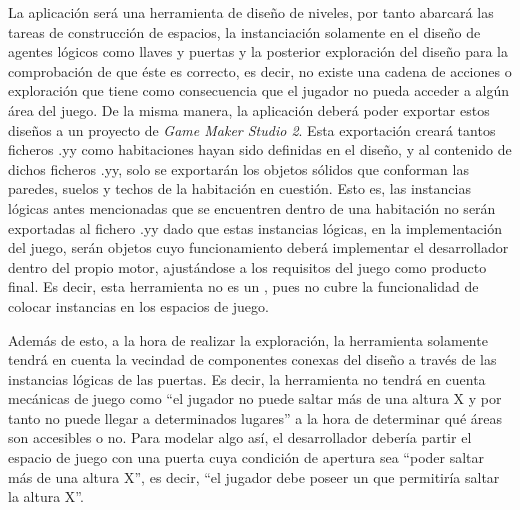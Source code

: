 La aplicación será una herramienta de diseño de niveles, por tanto abarcará las tareas de construcción de espacios, la instanciación solamente en el diseño de agentes lógicos como llaves y puertas y la posterior exploración del diseño para la comprobación de que éste es correcto, es decir, no existe una cadena de acciones o exploración que tiene como consecuencia que el jugador no pueda acceder a algún área del juego.
De la misma manera, la aplicación deberá poder exportar estos diseños a un proyecto de \textit{Game Maker Studio 2}. Esta exportación creará tantos ficheros .yy como habitaciones hayan sido definidas en el diseño, y al contenido de dichos ficheros .yy, solo se exportarán los objetos sólidos que conforman las paredes, suelos y techos de la habitación en cuestión. Esto es, las instancias lógicas antes mencionadas que se encuentren dentro de una habitación no serán exportadas al fichero .yy dado que estas instancias lógicas, en la implementación del juego, serán objetos cuyo funcionamiento deberá implementar el desarrollador dentro del propio motor, ajustándose a los requisitos del juego como producto final.
Es decir, esta herramienta no es un , pues no cubre la funcionalidad de colocar instancias en los espacios de juego.

Además de esto, a la hora de realizar la exploración, la herramienta solamente tendrá en cuenta la vecindad de componentes conexas del diseño a través de las instancias lógicas de las puertas. Es decir, la herramienta no tendrá en cuenta mecánicas de juego como ``el jugador no puede saltar más de una altura X y por tanto no puede llegar a determinados lugares'' a la hora de determinar qué áreas son accesibles o no. Para modelar algo así, el desarrollador debería partir el espacio de juego con una puerta cuya condición de apertura sea ``poder saltar más de una altura X'', es decir, ``el jugador debe poseer un  que permitiría saltar la altura X''.
